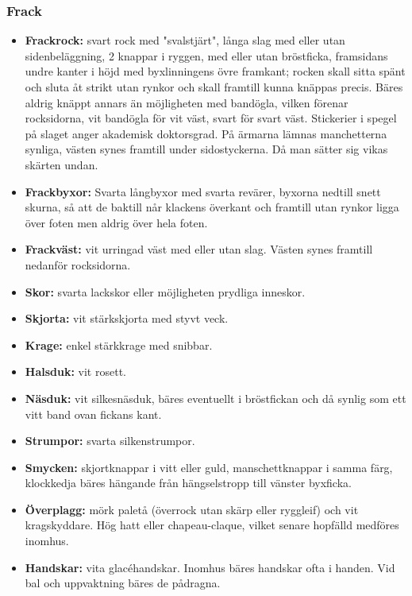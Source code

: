 \subsubsection*{\textbf{Frack}}
\begin{itemize}

    \item[]\textbf{Frackrock:} svart rock med "svalstjärt", långa slag med eller utan sidenbeläggning, 2 knappar i ryggen, med eller utan bröstficka, framsidans undre kanter i höjd med byxlinningens övre framkant; rocken skall sitta spänt och sluta åt strikt utan rynkor och skall framtill kunna knäppas precis. Bäres aldrig knäppt annars än möjligheten med bandögla, vilken förenar rocksidorna, vit bandögla för vit väst, svart för svart väst. Stickerier i spegel på slaget anger akademisk doktorsgrad. På ärmarna lämnas manchetterna synliga, västen synes framtill under sidostyckerna. Då man sätter sig vikas skärten undan.

    \item[]\textbf{Frackbyxor:} Svarta långbyxor med svarta revärer, byxorna nedtill snett skurna, så att de baktill når klackens överkant och framtill utan rynkor ligga över foten men aldrig över hela foten.

    \item[]\textbf{Frackväst:} vit urringad väst med eller utan slag. Västen synes framtill nedanför rocksidorna.

    \item[]\textbf{Skor:} svarta lackskor eller möjligheten prydliga inneskor.

    \item[]\textbf{Skjorta:} vit stärkskjorta med styvt veck.

    \item[]\textbf{Krage:} enkel stärkkrage med snibbar.

    \item[]\textbf{Halsduk:} vit rosett.

    \item[]\textbf{Näsduk:} vit silkesnäsduk, bäres eventuellt i bröstfickan och då synlig som ett vitt band ovan fickans kant.

    \item[]\textbf{Strumpor:} svarta silkenstrumpor.

    \item[]\textbf{Smycken:} skjortknappar i vitt eller guld, manschettknappar i samma färg, klockkedja bäres hängande från hängselstropp till vänster byxficka.

    \item[]\textbf{Överplagg:} mörk paletå (överrock utan skärp eller ryggleif) och vit kragskyddare. Hög hatt eller chapeau-claque, vilket senare hopfälld medföres inomhus.

    \item[]\textbf{Handskar:} vita glacéhandskar. Inomhus bäres handskar ofta i handen. Vid bal och uppvaktning bäres de pådragna.

\end{itemize}

